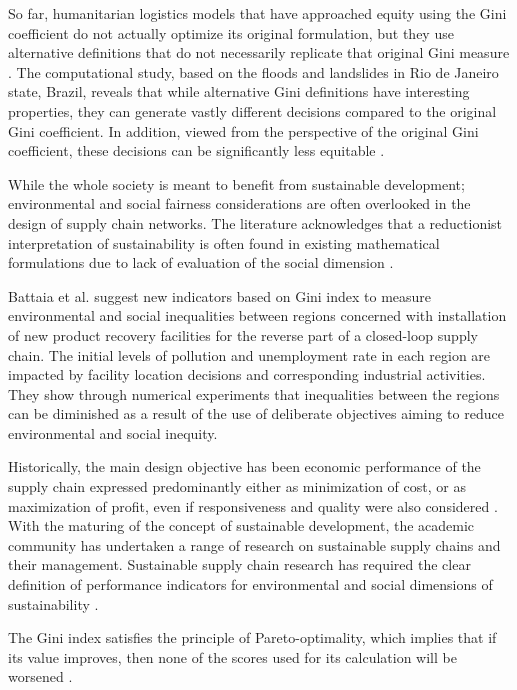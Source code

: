 So far, humanitarian logistics models that have approached equity using the Gini coefficient do not actually optimize its original formulation, but they use alternative definitions that do not necessarily replicate that original Gini measure \cite{alem2022revisiting}. The computational study, based on the floods and landslides in Rio de Janeiro state, Brazil, reveals that while alternative Gini definitions have interesting properties, they can generate vastly different decisions compared to the original Gini coefficient. In addition, viewed from the perspective of the original Gini coefficient, these decisions can be significantly less equitable \cite{alem2022revisiting}.

While the whole society is meant to benefit from sustainable development; environmental and social fairness considerations are often overlooked in the design of supply chain networks\cite{battaia2023environmental}. The literature acknowledges that a reductionist interpretation of sustainability is often found in existing mathematical formulations due to lack of evaluation of the social dimension \cite{battaia2023environmental}.

Battaia et al. \cite{battaia2023environmental} suggest new indicators based on Gini index to measure environmental and social inequalities between regions concerned with installation of new product recovery facilities for the reverse part of a closed-loop supply chain. The initial levels of pollution and unemployment rate in each region are impacted by facility location decisions and corresponding industrial activities. They show through numerical experiments that inequalities between the regions can be diminished as a result of the use of deliberate objectives aiming to reduce environmental and social inequity.

Historically, the main design objective has been economic performance of the supply chain expressed predominantly either as minimization of cost, or as maximization of profit, even if responsiveness and quality were also considered \cite{battaia2023environmental}. With the maturing of the concept of sustainable development, the academic community has undertaken a range of research on sustainable supply chains and their management. Sustainable supply chain research has required the clear definition of performance indicators for environmental and social dimensions of sustainability \cite{battaia2023environmental}.

The Gini index satisfies the principle of Pareto-optimality, which implies that if its value improves, then none of the scores used for its calculation will be worsened \cite{battaia2023environmental}.


